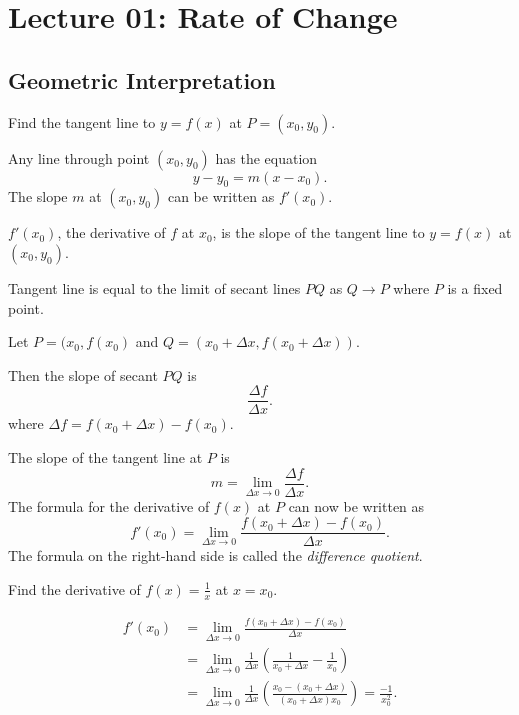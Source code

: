 \section{Lecture 01: Rate of Change}


\subsection{Geometric Interpretation}

Find the tangent line to \( y = f(x) \) at \( P = (x_0, y_0) \).

Any line through point \( (x_0, y_0) \) has the equation
\[
    y - y_0 = m(x - x_0).
\]
The slope \( m \) at \( (x_0, y_0) \) can be written as \( f'(x_0) \).

\begin{definition}
\( f'(x_0) \), the derivative of \( f \) at \( x_0 \), is the slope of
the tangent line to \( y = f(x) \) at \( (x_0, y_0) \).
\end{definition}

\begin{definition}
Tangent line is equal to the limit of secant lines \( PQ \) as \( Q \to
P \) where \( P \) is a fixed point.
\end{definition}

Let \( P = (x_0, f(x_0) \) and \( Q = (x_0 + \Delta x, f(x_0 + \Delta
x)) \).

Then the slope of secant \( PQ \) is
\[
    \frac{\Delta f}{\Delta x}.
\]
where \( \Delta f = f(x_0 + \Delta x) - f(x_0) \).

The slope of the tangent line at \( P \) is
\[
    m = \lim_{\Delta x \to 0} \frac{\Delta f}{\Delta x}.
\]
The formula for the derivative of \( f(x) \) at \( P \) can now be
written as
\[
    f'(x_0) = \lim_{\Delta x \to 0}
              \frac{f(x_0 + \Delta x) - f(x_0)}{\Delta x}.
\]
The formula on the right-hand side is called the \emph{difference
quotient}.

\begin{example}
Find the derivative of \( f(x) = \frac{1}{x} \) at \( x = x_0 \).
\end{example}
\begin{solution}
\begin{align*}
    f'(x_0)
        & = \lim_{\Delta x \to 0}
            \frac{f(x_0 + \Delta x) - f(x_0)}{\Delta x} \\
        & = \lim_{\Delta x \to 0}
            \frac{1}{\Delta x}
            \left( \frac{1}{x_0 + \Delta x} - \frac{1}{x_0} \right) \\
        & = \lim_{\Delta x \to 0}
            \frac{1}{\Delta x}
            \left( \frac{x_0 - (x_0 + \Delta x)}
                        {(x_0 + \Delta x)x_0} \right)
          = \frac{-1}{x_0^2}.
\end{align*}
\end{solution}

